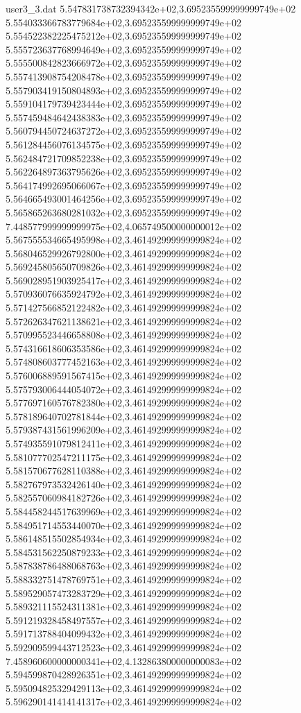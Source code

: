 \begin{filecontents}{user3_3.dat}
5.547831738732394342e+02,3.695235599999999749e+02
5.554033366783779684e+02,3.695235599999999749e+02
5.554522382225475212e+02,3.695235599999999749e+02
5.555723637768994649e+02,3.695235599999999749e+02
5.555500842823666972e+02,3.695235599999999749e+02
5.557413908754208478e+02,3.695235599999999749e+02
5.557903419150804893e+02,3.695235599999999749e+02
5.559104179739423444e+02,3.695235599999999749e+02
5.557459484642438383e+02,3.695235599999999749e+02
5.560794450724637272e+02,3.695235599999999749e+02
5.561284456076134575e+02,3.695235599999999749e+02
5.562484721709852238e+02,3.695235599999999749e+02
5.562264897363795626e+02,3.695235599999999749e+02
5.564174992695066067e+02,3.695235599999999749e+02
5.564665493001464256e+02,3.695235599999999749e+02
5.565865263680281032e+02,3.695235599999999749e+02
7.448577999999999975e+02,4.065749500000000012e+02
5.567555534665495998e+02,3.461492999999999824e+02
5.568046529926792800e+02,3.461492999999999824e+02
5.569245805650709826e+02,3.461492999999999824e+02
5.569028951903925417e+02,3.461492999999999824e+02
5.570936076635924792e+02,3.461492999999999824e+02
5.571427566852122482e+02,3.461492999999999824e+02
5.572626347621138621e+02,3.461492999999999824e+02
5.570995523446658808e+02,3.461492999999999824e+02
5.574316618606353586e+02,3.461492999999999824e+02
5.574808603777452163e+02,3.461492999999999824e+02
5.576006889591567415e+02,3.461492999999999824e+02
5.575793006444054072e+02,3.461492999999999824e+02
5.577697160576782380e+02,3.461492999999999824e+02
5.578189640702781844e+02,3.461492999999999824e+02
5.579387431561996209e+02,3.461492999999999824e+02
5.574935591079812411e+02,3.461492999999999824e+02
5.581077702547211175e+02,3.461492999999999824e+02
5.581570677628110388e+02,3.461492999999999824e+02
5.582767973532426140e+02,3.461492999999999824e+02
5.582557060984182726e+02,3.461492999999999824e+02
5.584458244517639969e+02,3.461492999999999824e+02
5.584951714553440070e+02,3.461492999999999824e+02
5.586148515502854934e+02,3.461492999999999824e+02
5.584531562250879233e+02,3.461492999999999824e+02
5.587838786488068763e+02,3.461492999999999824e+02
5.588332751478769751e+02,3.461492999999999824e+02
5.589529057473283729e+02,3.461492999999999824e+02
5.589321115524311381e+02,3.461492999999999824e+02
5.591219328458497557e+02,3.461492999999999824e+02
5.591713788404099432e+02,3.461492999999999824e+02
5.592909599443712523e+02,3.461492999999999824e+02
7.458960600000000341e+02,4.132863800000000083e+02
5.594599870428926351e+02,3.461492999999999824e+02
5.595094825329429113e+02,3.461492999999999824e+02
5.596290141414141317e+02,3.461492999999999824e+02

\end{filecontents}
